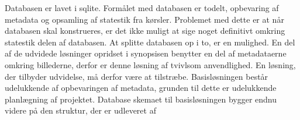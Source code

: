 Databasen er lavet i sqlite.
Formålet med databasen er todelt, opbevaring af metadata og opsamling af statestik fra kørsler.
Problemet med dette er at når databasen skal konstrueres, er det ikke muligt at sige noget definitivt omkring statestik delen af databasen.
At splitte databasen op i to, er en mulighed. 
En del af de udvidede løsninger opridset i synopsisen benytter en del af metadataerne omkring billederne, derfor er denne løsning af tvivlsom anvendlighed.
En løsning, der tilbyder udvidelse, må derfor være at tilstræbe.
Basisløsningen består udelukkende af opbevaringen af metadata, grunden til dette er udelukkende planlægning af projektet.
Database skemaet til basisløsningen bygger endnu videre på den struktur, der er udleveret af 
